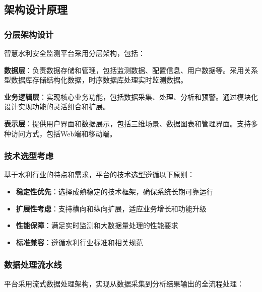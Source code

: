 \subsection{架构设计原理}\label{ux67b6ux6784ux8bbeux8ba1ux539fux7406}

\subsubsection{分层架构设计}\label{ux5206ux5c42ux67b6ux6784ux8bbeux8ba1}

智慧水利安全监测平台采用分层架构，包括：

\textbf{数据层}：负责数据存储和管理，包括监测数据、配置信息、用户数据等。采用关系型数据库存储结构化数据，时序数据库处理实时监测数据。

\textbf{业务逻辑层}：实现核心业务功能，包括数据采集、处理、分析和预警。通过模块化设计实现功能的灵活组合和扩展。

\textbf{表示层}：提供用户界面和数据展示，包括三维场景、数据图表和管理界面。支持多种访问方式，包括Web端和移动端。

\subsubsection{技术选型考虑}\label{ux6280ux672fux9009ux578bux8003ux8651}

基于水利行业的特点和需求，平台的技术选型遵循以下原则：

\begin{itemize}
\tightlist
\item
  \textbf{稳定性优先}：选择成熟稳定的技术框架，确保系统长期可靠运行
\item
  \textbf{扩展性考虑}：支持横向和纵向扩展，适应业务增长和功能升级
\item
  \textbf{性能保障}：满足实时监测和大数据量处理的性能要求
\item
  \textbf{标准兼容}：遵循水利行业标准和相关规范
\end{itemize}

\subsubsection{数据处理流水线}\label{ux6570ux636eux5904ux7406ux6d41ux6c34ux7ebf}

平台采用流式数据处理架构，实现从数据采集到分析结果输出的全流程处理：

